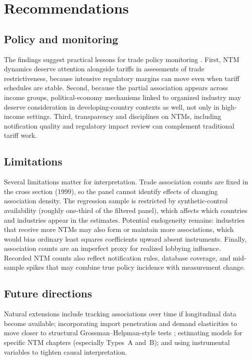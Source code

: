 \documentclass[12pt,letterpaper]{article}
\begin{document}
\section{Recommendations}

\subsection{Policy and monitoring}

The findings suggest practical lessons for trade policy monitoring \citep{bownPeters2018}. First, NTM dynamics deserve attention alongside tariffs in assessments of trade restrictiveness, because intensive regulatory margins can move even when tariff schedules are stable. Second, because the partial association appears across income groups, political-economy mechanisms linked to organized industry may deserve consideration in developing-country contexts as well, not only in high-income settings. Third, transparency and disciplines on NTMs, including notification quality and regulatory impact review can complement traditional tariff work.

\subsection{Limitations}

Several limitations matter for interpretation. Trade association counts are fixed in the cross section (1999), so the panel cannot identify effects of changing association density. The regression sample is restricted by synthetic-control availability (roughly one-third of the filtered panel), which affects which countries and industries appear in the estimates. Potential endogeneity remains: industries that receive more NTMs may also form or maintain more associations, which would bias ordinary least squares coefficients upward absent instruments. Finally, association counts are an imperfect proxy for realized lobbying influence. Recorded NTM counts also reflect notification rules, database coverage, and mid-sample spikes that may combine true policy incidence with measurement change.

\subsection{Future directions}

Natural extensions include tracking associations over time if longitudinal data become available; incorporating import penetration and demand elasticities to move closer to structural Grossman--Helpman-style tests \citep{mitraEtAl2002}; estimating models for specific NTM chapters (especially Types~A and~B); and using instrumental variables to tighten causal interpretation.
\end{document}
